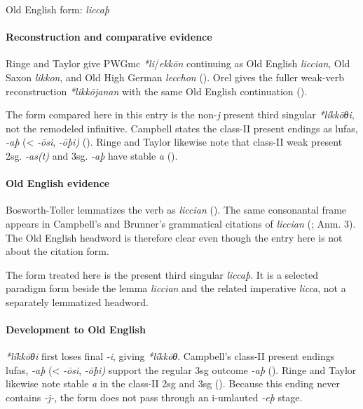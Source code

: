\documentclass[
  british,
  a4paper,
]{article}
\begin{document}
Old English form: \emph{liccaþ}

\paragraph{Reconstruction and comparative
evidence}\label{reconstruction-and-comparative-evidence-64}

Ringe and Taylor give PWGmc \emph{*li}/\emph{ekkōn} continuing as Old
English \emph{liccian}, Old Saxon \emph{likkon}, and Old High German
\emph{lecchon} (). Orel gives the fuller weak-verb reconstruction \emph{*likkōjanan}
with the same Old English continuation ().

The form compared here in this entry is the non-\emph{j} present third
singular \emph{*líkkōθi}, not the remodeled infinitive. Campbell states
the class-II present endings as lufas, \emph{-aþ} (\textless{}
\emph{-ōsi}, \emph{-ōþi)} (). Ringe and Taylor likewise note that class-II weak present
2sg. \emph{-as(t)} and 3sg. \emph{-aþ} have stable \emph{a}
().

\paragraph{Old English evidence}\label{old-english-evidence-64}

Bosworth-Toller lemmatizes the verb as \emph{liccian}
(). The
same consonantal frame appears in Campbell's and Brunner's grammatical
citations of \emph{liccian} (; 
Anm. 3). The Old English headword is therefore clear even though the
entry here is not about the citation form.

The form treated here is the present third singular \emph{liccaþ}. It is
a selected paradigm form beside the lemma \emph{liccian} and the related
imperative \emph{licca}, not a separately lemmatized headword.

\paragraph{Development to Old
English}\label{development-to-old-english-64}

\emph{*líkkōθi} first loses final \emph{-i}, giving \emph{*líkkōθ}.
Campbell's class-II present endings lufas, \emph{-aþ} (\textless{}
\emph{-ōsi}, \emph{-ōþi)} support the regular 3sg outcome \emph{-aþ}
(). Ringe and
Taylor likewise note stable \emph{a} in the class-II 2sg and 3sg
(). Because
this ending never contains \emph{-j-}, the form does not pass through an
i-umlauted \emph{-eþ} stage.
\end{document}
